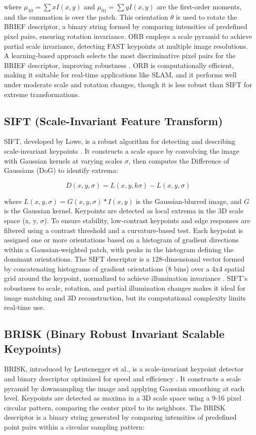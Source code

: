 \documentclass[journal]{IEEEtran}
\begin{document}
where \( \mu_{10} = \sum x I(x, y) \) and \( \mu_{01} = \sum y I(x, y) \) are the first-order moments, and the summation is over the patch. This orientation \( \theta \) is used to rotate the BRIEF descriptor, a binary string formed by comparing intensities of predefined pixel pairs, ensuring rotation invariance. ORB employs a scale pyramid to achieve partial scale invariance, detecting FAST keypoints at multiple image resolutions. A learning-based approach selects the most discriminative pixel pairs for the BRIEF descriptor, improving robustness \cite{ORB}. ORB is computationally efficient, making it suitable for real-time applications like SLAM, and it performs well under moderate scale and rotation changes, though it is less robust than SIFT for extreme transformations.

\subsection{SIFT (Scale-Invariant Feature Transform)}
SIFT, developed by Lowe, is a robust algorithm for detecting and describing scale-invariant keypoints \cite{SIFT}. It constructs a scale space by convolving the image with Gaussian kernels at varying scales \( \sigma \), then computes the Difference of Gaussians (DoG) to identify extrema:

\begin{equation}
D(x, y, \sigma) = L(x, y, k\sigma) - L(x, y, \sigma)
\end{equation}

where \( L(x, y, \sigma) = G(x, y, \sigma) * I(x, y) \) is the Gaussian-blurred image, and \( G \) is the Gaussian kernel. Keypoints are detected as local extrema in the 3D scale space (x, y, \( \sigma \)). To ensure stability, low-contrast keypoints and edge responses are filtered using a contrast threshold and a curvature-based test. Each keypoint is assigned one or more orientations based on a histogram of gradient directions within a Gaussian-weighted patch, with peaks in the histogram defining the dominant orientations. The SIFT descriptor is a 128-dimensional vector formed by concatenating histograms of gradient orientations (8 bins) over a 4x4 spatial grid around the keypoint, normalized to achieve illumination invariance \cite{SIFT}. SIFT’s robustness to scale, rotation, and partial illumination changes makes it ideal for image matching and 3D reconstruction, but its computational complexity limits real-time use.

\subsection{BRISK (Binary Robust Invariant Scalable Keypoints)}
BRISK, introduced by Leutenegger et al., is a scale-invariant keypoint detector and binary descriptor optimized for speed and efficiency \cite{BRISK}. It constructs a scale pyramid by downsampling the image and applying Gaussian smoothing at each level. Keypoints are detected as maxima in a 3D scale space using a 9-16 pixel circular pattern, comparing the center pixel to its neighbors. The BRISK descriptor is a binary string generated by comparing intensities of predefined point pairs within a circular sampling pattern:
\end{document}
